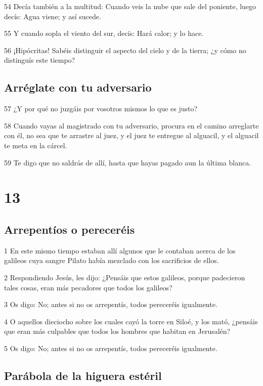 \par 54 Decía también a la multitud: Cuando veis la nube que sale del poniente, luego decís: Agua viene; y así sucede.
\par 55 Y cuando sopla el viento del sur, decís: Hará calor; y lo hace.
\par 56 ¡Hipócritas! Sabéis distinguir el aspecto del cielo y de la tierra; ¿y cómo no distinguís este tiempo?

\section*{Arréglate con tu adversario}

\par 57 ¿Y por qué no juzgáis por vosotros mismos lo que es justo?
\par 58 Cuando vayas al magistrado con tu adversario, procura en el camino arreglarte con él, no sea que te arrastre al juez, y el juez te entregue al alguacil, y el alguacil te meta en la cárcel.
\par 59 Te digo que no saldrás de allí, hasta que hayas pagado aun la última blanca.

\chapter{13}

\section*{Arrepentíos o pereceréis}

\par 1 En este mismo tiempo estaban allí algunos que le contaban acerca de los galileos cuya sangre Pilato había mezclado con los sacrificios de ellos.
\par 2 Respondiendo Jesús, les dijo: ¿Pensáis que estos galileos, porque padecieron tales cosas, eran más pecadores que todos los galileos?
\par 3 Os digo: No; antes si no os arrepentís, todos pereceréis igualmente.
\par 4 O aquellos dieciocho sobre los cuales cayó la torre en Siloé, y los mató, ¿pensáis que eran más culpables que todos los hombres que habitan en Jerusalén?
\par 5 Os digo: No; antes si no os arrepentís, todos pereceréis igualmente.

\section*{Parábola de la higuera estéril}

